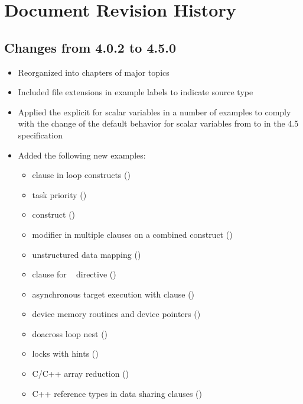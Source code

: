 \chapter{Document Revision History}
\label{chap:history}

\section{Changes from 4.0.2 to 4.5.0}
\begin{itemize}
\item Reorganized into chapters of major topics
\item Included file extensions in example labels to indicate source type
\item Applied the explicit  for scalar variables 
in a number of examples to comply with 
the change of the default behavior for scalar variables from 
 to  in the 4.5 specification
\item Added the following new examples:
\begin{itemize}
\item {} clause in loop constructs ()
\item task priority ()
\item {} construct ()
\item {} modifier in multiple  clauses on
a combined construct ()
\item unstructured data mapping ()
\item {} clause for ~ directive 
()
\item asynchronous target execution with  clause ()
\item device memory routines and device pointers
()
\item doacross loop nest ()
\item locks with hints ()
\item C/C++ array reduction ()
\item C++ reference types in data sharing clauses ()
\end{itemize}
\end{itemize}

